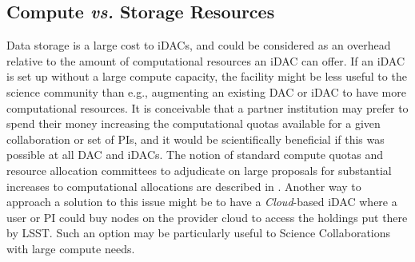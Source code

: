\subsection{Compute {\it vs.} Storage Resources} \label{sec:cvs}
Data storage is a large cost to iDACs, and could be considered as an overhead relative to the amount of computational resources an iDAC can offer. If an iDAC is set up without a large compute capacity, the facility might be less useful to the science community than e.g., augmenting an existing DAC or iDAC to have more computational resources. It is conceivable that a partner institution may prefer to spend their money increasing the computational quotas available for a given collaboration or set of PIs, and it would be scientifically beneficial if this was possible at all DAC and iDACs. The notion of standard compute quotas and resource allocation committees to adjudicate on large proposals for substantial increases to computational allocations are described in . Another way to approach a solution to this issue might be to have a \emph{Cloud}-based iDAC where a user or PI could buy nodes on the provider cloud to access the holdings put there by LSST.  Such an option may be particularly useful to Science Collaborations with large compute needs.

